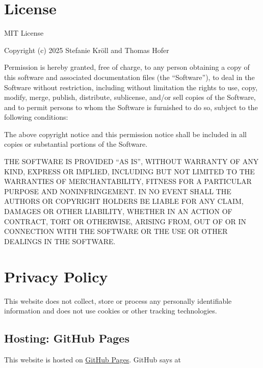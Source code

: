 \documentclass[
  letterpaper,
  DIV=11,
  numbers=noendperiod]{scrreprt}
\newlength{\cslhangindent}
\newenvironment{CSLReferences}[2] %
 {\begin{list}{}{%
  \setlength{\itemindent}{0pt}
  \setlength{\leftmargin}{0pt}
  \setlength{\parsep}{0pt}
  \ifodd #1
   \setlength{\leftmargin}{\cslhangindent}
   \setlength{\itemindent}{-1\cslhangindent}
  \fi
  \setlength{\itemsep}{#2\baselineskip}}}
 {\end{list}}
\begin{document}

\label{refs}
\begin{CSLReferences}{0}{1}
\end{CSLReferences}

\chapter{License}\label{license}

MIT License

Copyright (c) 2025 Stefanie Kröll and Thomas Hofer

Permission is hereby granted, free of charge, to any person obtaining a
copy of this software and associated documentation files (the
``Software''), to deal in the Software without restriction, including
without limitation the rights to use, copy, modify, merge, publish,
distribute, sublicense, and/or sell copies of the Software, and to
permit persons to whom the Software is furnished to do so, subject to
the following conditions:

The above copyright notice and this permission notice shall be included
in all copies or substantial portions of the Software.

THE SOFTWARE IS PROVIDED ``AS IS'', WITHOUT WARRANTY OF ANY KIND,
EXPRESS OR IMPLIED, INCLUDING BUT NOT LIMITED TO THE WARRANTIES OF
MERCHANTABILITY, FITNESS FOR A PARTICULAR PURPOSE AND NONINFRINGEMENT.
IN NO EVENT SHALL THE AUTHORS OR COPYRIGHT HOLDERS BE LIABLE FOR ANY
CLAIM, DAMAGES OR OTHER LIABILITY, WHETHER IN AN ACTION OF CONTRACT,
TORT OR OTHERWISE, ARISING FROM, OUT OF OR IN CONNECTION WITH THE
SOFTWARE OR THE USE OR OTHER DEALINGS IN THE SOFTWARE.

\chapter{Privacy Policy}\label{privacy-policy}

This website does not collect, store or process any personally
identifiable information and does not use cookies or other tracking
technologies.

\section{Hosting: GitHub Pages}\label{hosting-github-pages}

This website is hosted on \href{https://pages.github.com/}{GitHub
Pages}. GitHub says at
\end{document}
